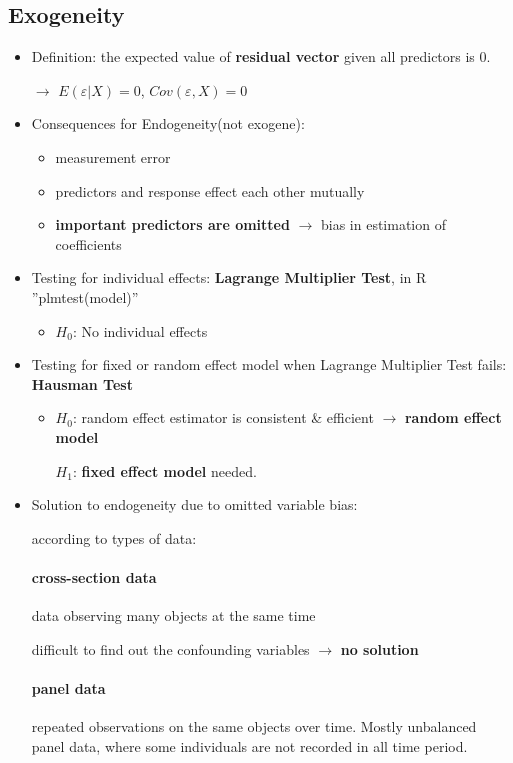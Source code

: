 \subsection{Exogeneity}
\begin{itemize}
	\item Definition: the expected value of \textbf{residual vector} given all predictors is 0.
	
	$\rightarrow$ $E(\varepsilon|X) = 0$, $Cov(\varepsilon, X) = 0$
		
	
	\item Consequences for Endogeneity(not exogene):
	\begin{itemize}
		\item measurement error
		\item predictors and response effect each other mutually
		\item \textbf{important predictors are omitted} $\rightarrow$ bias in estimation of coefficients 
	\end{itemize}
	
	\item Testing for individual effects: \textbf{Lagrange Multiplier Test}, in R ''plmtest(model)''
	\begin{itemize}
		\item $H_0$: No individual effects
	\end{itemize}
	\item Testing for fixed or random effect model when Lagrange Multiplier Test fails: \textbf{Hausman Test}
	\begin{itemize}
		\item $H_0$: random effect estimator is consistent \& efficient $\rightarrow$ \textbf{random effect model}
		
		$H_1$: \textbf{fixed effect model} needed.
	\end{itemize}
	
	\item Solution to endogeneity due to omitted variable bias:
	
	according to types of data: 
	\paragraph{cross-section data} data observing many objects at the same time
		
	difficult to find out the confounding variables $\rightarrow$ \textbf{no solution}
	\paragraph{panel data} repeated observations on the same objects over time. Mostly unbalanced panel data, where some individuals are not recorded in all time period. 
	

\end{itemize}
